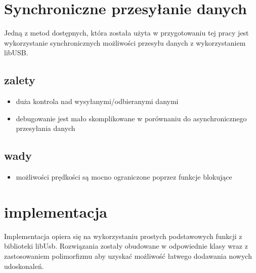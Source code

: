 \documentclass{BscUS}
\begin{document}
\chapter{Synchroniczne przesyłanie danych}
\label{synchronicChapter}
Jedną z metod dostępnych, która została użyta w przygotowaniu tej pracy jest wykorzystanie synchronicznych możliwości przesyłu danych z wykorzystaniem libUSB.

\section{zalety}
\begin{itemize}
\item duża kontrola nad wysyłanymi/odbieranymi danymi
\item debugowanie jest mało skomplikowane w porównaniu do asynchronicznego przesyłania danych
\end{itemize}
\section{wady}
\begin{itemize}
\item możliwości prędkości są mocno ograniczone poprzez funkcje blokujące

\end{itemize}
\chapter{implementacja}
\label{implementationChapter}
Implementacja opiera się na wykorzystaniu prostych podstawowych funkcji z biblioteki libUsb. Rozwiązania zostały obudowane w odpowiednie klasy wraz z zastosowaniem polimorfizmu aby uzyskać możliwość łatwego dodawania nowych udoskonaleń.
\end{document}
